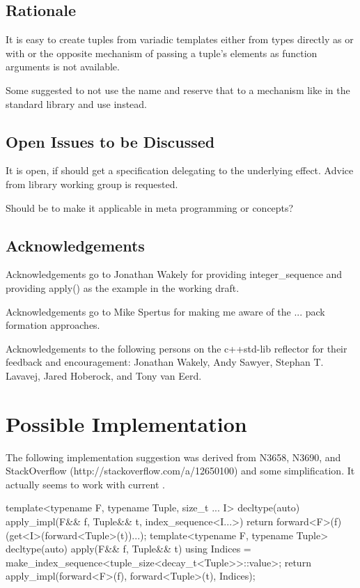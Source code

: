 \documentclass[ebook,11pt,article]{memoir}
\begin{document}
\section{Rationale}
It is easy to create tuples from variadic templates either from types directly as  or  with  or  the opposite mechanism of passing a tuple's elements as function arguments is not available.

Some suggested to not use the name and reserve that to a mechanism like \emph{} in the standard library and use  instead.

\section{Open Issues to be Discussed}
It is open, if  should get a  specification delegating to the underlying effect. Advice from library working group is requested.

Should  be  to make it applicable in meta programming or concepts?

\section{Acknowledgements}
Acknowledgements go to Jonathan Wakely for providing integer_sequence and providing apply() as the example in the working draft.

Acknowledgements go to Mike Spertus for making me aware of the ... pack formation approaches.

Acknowledgements to the following persons on the c++std-lib reflector for their feedback and encouragement: Jonathan Wakely, Andy Sawyer, Stephan T. Lavavej, Jared Hoberock, and Tony van Eerd.

\chapter{Possible Implementation}
The following implementation suggestion was derived from N3658, N3690, and StackOverflow (http://stackoverflow.com/a/12650100) and some simplification. It actually seems to work with current .

\begin{codeblock}
template<typename F, typename Tuple, size_t ... I>
decltype(auto) apply_impl(F&& f, Tuple&& t, index_sequence<I...>) {
	return forward<F>(f)(get<I>(forward<Tuple>(t))...);
}
template<typename F, typename Tuple>
decltype(auto) apply(F&& f, Tuple&& t) {
  using Indices = make_index_sequence<tuple_size<decay_t<Tuple>>::value>;
  return apply_impl(forward<F>(f), forward<Tuple>(t), Indices{});
}
\end{codeblock}
\end{document}
